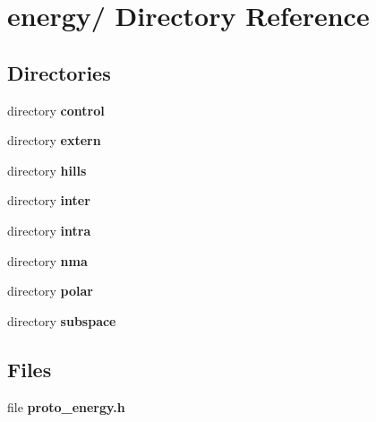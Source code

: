 \section{energy/ Directory Reference}
\label{dir_ffb9ce85c9b38ce4389c00598397266d}
\subsection*{Directories}
\begin{CompactItemize}
\item 
directory {\bf control}
\item 
directory {\bf extern}
\item 
directory {\bf hills}
\item 
directory {\bf inter}
\item 
directory {\bf intra}
\item 
directory {\bf nma}
\item 
directory {\bf polar}
\item 
directory {\bf subspace}
\end{CompactItemize}
\subsection*{Files}
\begin{CompactItemize}
\item 
file {\bf proto\_\-energy.h}
\end{CompactItemize}
